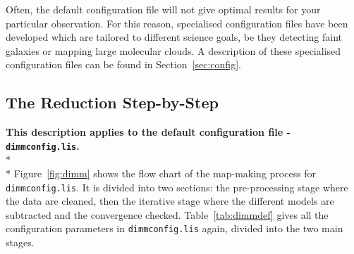 \documentclass[twoside,11pt]{article}
\newcommand{\htmlref}[2]{#1}
\newcommand{\latexhtml}[2]{#1}
\renewcommand{\_}{\texttt{\symbol{95}}}
\newcommand{\cref}[3]{\latexhtml{#1~\ref{#2}}{\htmlref{#3}{#2}}}
\begin{document}
Often, the default configuration file will not give optimal results
for your particular observation. For this reason, specialised
configuration files have been developed which are tailored to
different science goals, be they detecting faint galaxies or mapping
large molecular clouds. A
description of these specialised configuration files can be found
\cref{in Section}{sec:config}{here}.

\subsection{The Reduction Step-by-Step}

\textbf{This description applies to the default configuration file -
\texttt{dimmconfig.lis}.}\\*\\* \cref{Figure}{fig:dimm}{The graphic
below} shows the flow chart of the map-making process
for \texttt{dimmconfig.lis}. It is divided into two sections: the
pre-processing stage where the data are cleaned, then the iterative
stage where the different models are subtracted and the convergence checked.
\cref{Table}{tab:dimmdef}{A table of active variables} gives all the
configuration parameters in \texttt{dimmconfig.lis} again, divided
into the two main stages.
\end{document}

